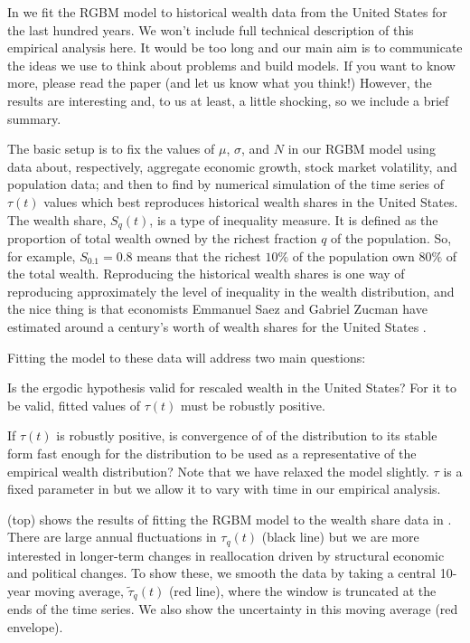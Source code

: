 In \cite{BermanPetersAdamou2017} we fit the RGBM model to historical wealth data from the United States for the last hundred years. We won't include full technical description of this empirical analysis here. It would be too long and our main aim is to communicate the ideas we use to think about problems and build models. If you want to know more, please read the paper (and let us know what you think!) However, the results are interesting and, to us at least, a little shocking, so we include a brief summary.

The basic setup is to fix the values of $\mu$, $\sigma$, and $N$ in our RGBM model using data about, respectively, aggregate economic growth, stock market volatility, and population data; and then to find by numerical simulation of  the time series of $\tau(t)$ values which best reproduces historical wealth shares in the United States. The wealth share, $S_q(t)$, is a type of inequality measure. It is defined as the proportion of total wealth owned by the richest fraction $q$ of the population. So, for example, $S_{0.1}=0.8$ means that the richest $10\%$ of the population own $80\%$ of the total wealth. Reproducing the historical wealth shares is one way of reproducing approximately the level of inequality in the wealth distribution, and the nice thing is that economists Emmanuel Saez and Gabriel Zucman have estimated around a century's worth of wealth shares for the United States \cite{SaezZucman2014}.

Fitting the model to these data will address two main questions:
\bi
\item Is the ergodic hypothesis valid for rescaled wealth in the United States? For it to be valid, fitted values of $\tau\left(t\right)$ must be robustly positive.
\item If $\tau\left(t\right)$ is robustly positive, is convergence of of the distribution to its stable form fast enough for the distribution to be used as a representative of the empirical wealth distribution?
\ei
Note that we have relaxed the model slightly. $\tau$ is a fixed parameter in  but we allow it to vary with time in our empirical analysis.

 (top) shows the results of fitting the RGBM model to the wealth share data in \cite{SaezZucman2014}. There are large annual fluctuations in $\tau_q\left(t\right)$ (black line) but we are more interested in longer-term changes in reallocation driven by structural economic and political changes. To show these, we smooth the data by taking a central 10-year moving average, $\widetilde{\tau}_q\left(t\right)$ (red line), where the window is truncated at the ends of the time series. We also show the uncertainty in this moving average (red envelope).

